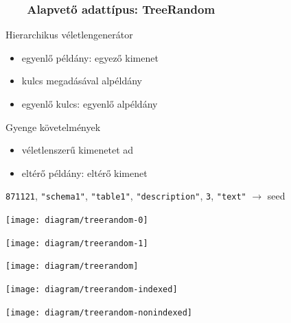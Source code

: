 \documentclass[
]{beamer}
\newcommand{\slidetitle}[2]{\frametitle{{\small #1 ~ \ding{226} ~ } \normalsize \textbf{#2} }}
\begin{document}
\begin{frame}
    \slidetitle{\sectionshorttitle}{Alapvető adattípus: TreeRandom}
    
    \begin{minipage}[c]{0.5\textwidth}
        \vspace{0.5em}
        
        {\color{beamer@blendedblue}Hierarchikus véletlengenerátor}
        
        \vspace{0.2cm}
        
        \begin{itemize}
            \item egyenlő példány: egyező kimenet
            \item kulcs megadásával alpéldány
            \item egyenlő kulcs: egyenlő alpéldány
        \end{itemize}

        \vspace{0.7cm}
        
        {\color{beamer@blendedblue}Gyenge követelmények}

        \vspace{0.2cm}
        
        \begin{itemize}
            \item véletlenszerű kimenetet ad
            \item eltérő példány: eltérő kimenet
        \end{itemize}

        \begin{overprint}
            \begin{flushright}
                \vspace{2.5em}
                
                { \tiny \color{BrickRed}
                    \texttt{871121}{\color{RoyalPurple},}%
                    \texttt{"schema1"}{\color{RoyalPurple},}%
                    \texttt{"table1"}{\color{RoyalPurple},}%
                    \texttt{"description"}{\color{RoyalPurple},}%
                    \texttt{3}{\color{RoyalPurple},}%
                    \texttt{"text"} {\color{RoyalPurple}$\rightarrow$}
                    seed
                }
            \end{flushright}
        \end{overprint}
    \end{minipage}%
    \begin{minipage}[c]{0.5\textwidth}
        \begin{overprint}
            \centerline{\texttt{[image: diagram/treerandom-0]}}
            \centerline{\texttt{[image: diagram/treerandom-1]}}
            \centerline{\texttt{[image: diagram/treerandom]}}
            \centerline{\texttt{[image: diagram/treerandom-indexed]}}
            \centerline{\texttt{[image: diagram/treerandom-nonindexed]}}
        \end{overprint}
    \end{minipage}
\end{frame}
\end{document}
